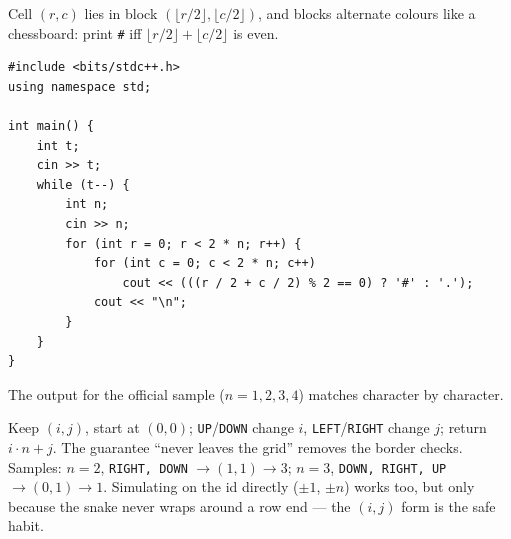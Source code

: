 \begin{solutionbox}[E4.2 Upscaling]
Cell $(r, c)$ lies in block $(\lfloor r/2 \rfloor, \lfloor c/2 \rfloor)$, and blocks alternate colours like a chessboard: print \texttt{\#} iff $\lfloor r/2 \rfloor + \lfloor c/2 \rfloor$ is even.
\begin{center}
\end{center}
\begin{lstlisting}[style=cpp]
#include <bits/stdc++.h>
using namespace std;

int main() {
    int t;
    cin >> t;
    while (t--) {
        int n;
        cin >> n;
        for (int r = 0; r < 2 * n; r++) {
            for (int c = 0; c < 2 * n; c++)
                cout << (((r / 2 + c / 2) % 2 == 0) ? '#' : '.');
            cout << "\n";
        }
    }
}
\end{lstlisting}
The output for the official sample ($n = 1, 2, 3, 4$) matches character by character.
\end{solutionbox}

\begin{solutionbox}
Keep $(i, j)$, start at $(0,0)$; \texttt{UP}/\texttt{DOWN} change $i$, \texttt{LEFT}/\texttt{RIGHT} change $j$; return $i \cdot n + j$. The guarantee ``never leaves the grid'' removes the border checks. Samples: $n = 2$, \texttt{RIGHT, DOWN} $\to (1,1) \to 3$; $n = 3$, \texttt{DOWN, RIGHT, UP} $\to (0,1) \to 1$. Simulating on the id directly ($\pm 1$, $\pm n$) works too, but only because the snake never wraps around a row end --- the $(i, j)$ form is the safe habit.
\end{solutionbox}

